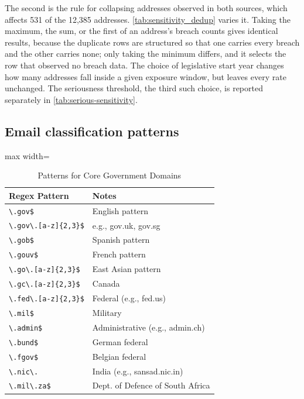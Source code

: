 \documentclass[12pt, letterpaper]{article}
\begin{document}
The second is the rule for collapsing addresses observed in both sources, which affects 531 of the 12,385 addresses. \cref{tab:sensitivity_dedup} varies it. Taking the maximum, the sum, or the first of an address's breach counts gives identical results, because the duplicate rows are structured so that one carries every breach and the other carries none; only taking the minimum differs, and it selects the row that observed no breach data. The choice of legislative start year changes how many addresses fall inside a given exposure window, but leaves every rate unchanged. The seriousness threshold, the third such choice, is reported separately in \cref{tab:serious-sensitivity}.





\subsection*{Email classification patterns}

\begin{table}[!htbp]
\centering
\scriptsize
\setlength\tabcolsep{10 pt}
\caption{Patterns for Core Government Domains}
\label{tab:regex_core_government_domains}
\begin{adjustbox}{max width=\linewidth}
\begin{tabular}{@{\hspace{0\tabcolsep}}ll@{\hspace{0\tabcolsep}}}
\toprule
\textbf{Regex Pattern} & \textbf{Notes} \\
\midrule
\verb|\.gov$| & English pattern \\
\verb|\.gov\.[a-z]{2,3}$| & e.g., gov.uk, gov.sg \\
\verb|\.gob$| & Spanish pattern \\
\verb|\.gouv$| & French pattern \\
\verb|\.go\.[a-z]{2,3}$| & East Asian pattern \\
\verb|\.gc\.[a-z]{2,3}$| & Canada \\
\verb|\.fed\.[a-z]{2,3}$| & Federal (e.g., fed.us) \\
\verb|\.mil$| & Military \\
\verb|\.admin$| & Administrative (e.g., admin.ch) \\
\verb|\.bund$| & German federal \\
\verb|\.fgov$| & Belgian federal \\
\verb|\.nic\.| & India (e.g., sansad.nic.in) \\
\verb|\.mil\.za$| & Dept. of Defence of South Africa \\
\bottomrule
\end{tabular}
\end{adjustbox}
\end{table}
\end{document}
